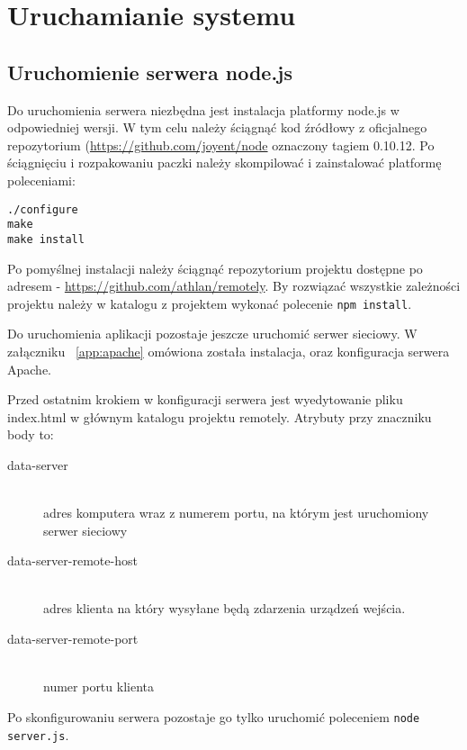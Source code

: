 

\section{Uruchamianie systemu}

\subsection{Uruchomienie serwera node.js}

Do uruchomienia serwera niezbędna jest instalacja platformy node.js w odpowiedniej wersji. W tym celu należy ściągnąć kod źródłowy z oficjalnego repozytorium (\url{https://github.com/joyent/node} oznaczony tagiem 0.10.12. Po ściągnięciu i rozpakowaniu paczki należy skompilować i zainstalować platformę poleceniami:

\begin{lstlisting}
./configure
make
make install
\end{lstlisting}

Po pomyślnej instalacji należy ściągnąć repozytorium projektu dostępne po adresem - \url{https://github.com/athlan/remotely}. By rozwiązać wszystkie zależności projektu należy w katalogu z projektem wykonać polecenie \lstinline{npm install}.
\par
Do uruchomienia aplikacji pozostaje jeszcze uruchomić serwer sieciowy. W załączniku ~\ref{app:apache} omówiona została instalacja, oraz konfiguracja serwera Apache.
\par
Przed ostatnim krokiem w konfiguracji serwera jest wyedytowanie pliku index.html w głównym katalogu projektu remotely. Atrybuty przy znaczniku body to:
\begin{description}
	\item[data-server] \hfill \\
		adres komputera wraz z numerem portu, na którym jest uruchomiony serwer sieciowy
	\item[data-server-remote-host] \hfill \\
		adres klienta na który wysyłane będą zdarzenia urządzeń wejścia.
	\item[data-server-remote-port] \hfill \\
		numer portu klienta
\end{description}
\par
Po skonfigurowaniu serwera pozostaje go tylko uruchomić poleceniem \lstinline{node server.js}.


